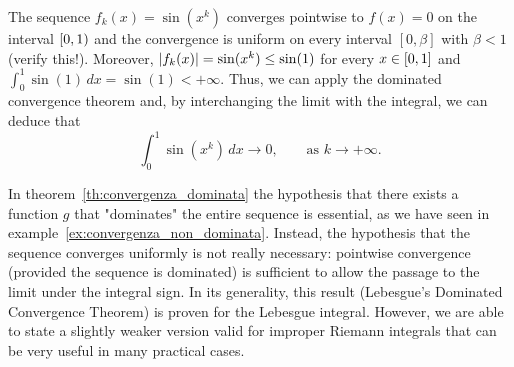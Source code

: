 \begin{example}
The sequence $f_k(x) = \sin(x^k)$ converges pointwise to $f(x)=0$ on the
interval
$\left[0,1\right)$ and the convergence is uniform on every interval
$[0,\beta]$
with $\beta < 1$ (verify this!).
Moreover, ${\left|f_k(x)\right|} = \sin(x^k) \le \sin(1)$ for every $x\in {\left[ 0,1 \right]}$
and $\int_0^1 \sin(1)\, dx = \sin(1)< +\infty$.
Thus, we can apply the dominated convergence theorem and,
by interchanging the limit with the integral, we can deduce that
\[
  \int_0^1 \sin (x^k)\, dx \to 0, \qquad \text{as $k\to +\infty$.}
\]
\end{example}

In theorem~\ref{th:convergenza_dominata}
the hypothesis that there exists a function $g$ that "dominates" the entire
sequence
is essential, as we have seen in example~\ref{ex:convergenza_non_dominata}.
Instead, the hypothesis that the sequence converges uniformly is not really
necessary:
pointwise convergence (provided the sequence is dominated) is sufficient 
to allow the passage to the limit under the integral sign.
In its generality, this result (Lebesgue's Dominated Convergence Theorem) 
is proven for the Lebesgue integral.
%
%
%
%
%
However, we are able to state a slightly weaker version valid for improper
Riemann integrals that can be very useful in many practical cases.

